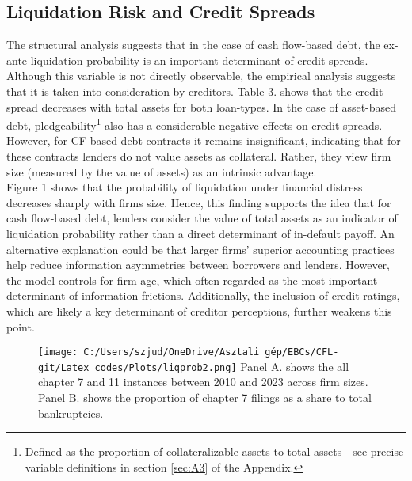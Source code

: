 \documentclass[12pt]{article}
\begin{document}
\subsection{Liquidation Risk and Credit Spreads \label{sec:emp liqprob}} 
The structural analysis suggests that in the case of cash flow-based debt, the ex-ante liquidation probability is an important determinant of credit spreads. Although this variable is not directly observable, the empirical analysis suggests that it is taken into consideration by creditors. Table 3. shows that the credit spread decreases with total assets for both loan-types. In the case of asset-based debt, pledgeability\footnote{Defined as the proportion of collateralizable assets to total assets - see precise variable definitions in section \ref{sec:A3} of the Appendix.} also has a considerable negative effects on credit spreads. However, for CF-based debt contracts it remains insignificant, indicating that for these contracts lenders do not value assets as collateral. Rather, they view firm size (measured by the value of assets) as an intrinsic advantage. \vspace{3mm} \\
Figure 1 shows that the probability of liquidation under financial distress decreases sharply with firms size. Hence, this finding supports the idea that for cash flow-based debt, lenders consider the value of total assets as an indicator of liquidation probability rather than a direct determinant of in-default payoff. An alternative explanation could be that larger firms’ superior accounting practices help reduce information asymmetries between borrowers and lenders. However, the model controls for firm age, which often regarded as the most important determinant of information frictions. Additionally, the inclusion of credit ratings, which are likely a key determinant of creditor perceptions, further weakens this point.
\begin{figure}[H]  %
    \centering  \label{chart:mixplot}
    \texttt{[image: C:/Users/szjud/OneDrive/Asztali gép/EBCs/CFL-git/Latex codes/Plots/liqprob2.png]}
    \footnotesize \justifying Panel A. shows the all chapter 7 and 11 instances between 2010 and 2023 across firm sizes. Panel B. shows the proportion of chapter 7 filings as a share to total bankruptcies. 
\end{figure}
\end{document}
